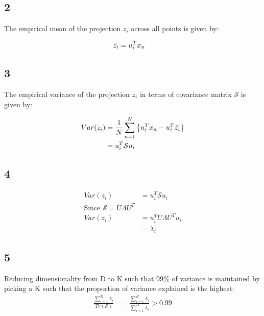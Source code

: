 \documentclass[a4paper]{article}
\begin{document}
\subsection*{2}
The empirical mean of the projection $z_{i}$ across all points is given by:

\begin{align*}
    \Bar{z_{i}} &= u_{i}^{T}x_{n}
\end{align*}{}


\subsection*{3}
The empirical variance of the projection $z_{i}$ in terms of covariance matrix $\mathcal{S}$ is given by:

\begin{align*}
    Var(z_{i}) &= \frac{1}{N}\sum_{n=1}^{N}\left \{u_{i}^{T}x_{n} - u_{i}^{T} \Bar{z_{i}} \right\} \\
    &= u_{i}^{T}\mathcal{S}u_{i}
\end{align*}{}


\subsection*{4}
\begin{align*}
    Var(z_{i}) &= u_{i}^{T}\mathcal{S}u_{i} \\
    \text{Since } \mathcal{S} = U\Lambda U^{T}\\
     Var(z_{i}) &= u_{i}^{T}U\Lambda U^{T}u_{i} \\
     &= \lambda_{i}
\end{align*}{}

\subsection*{5}

Reducing dimensionality from D to K such that 99\% of variance is maintained by picking a K such that the proportion of variance explained is the highest:
\begin{align*}
    \frac{\sum_{i=1}^{K}\lambda_{i}}{Tr(\mathcal{S})} &= \frac{\sum_{i=1}^{K}\lambda_{i}}{\sum_{i=1}^{D}\lambda_{i}} > 0.99
\end{align*}{}
\end{document}
